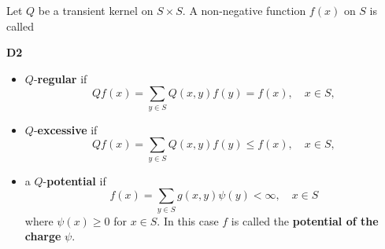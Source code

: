 Let $Q$ be a transient kernel on $S \times S$. A non-negative function $f(x)$ on $S$ is called

\textbf{D2}
\begin{itemize}
\item[(a)] $Q$-\textbf{regular} if
$$Qf(x) = \sum_{y \in S} Q(x,y)f(y) = f(x), \quad x \in S,$$

\item[(b)] $Q$-\textbf{excessive} if
$$Qf(x) = \sum_{y \in S} Q(x,y)f(y) \leq f(x), \quad x \in S,$$

\item[(c)] a $Q$-\textbf{potential} if
$$f(x) = \sum_{y \in S} g(x,y)\psi(y) < \infty, \quad x \in S$$
where $\psi(x) \geq 0$ for $x \in S$. In this case $f$ is called the \textbf{potential of the charge} $\psi$.
\end{itemize}
